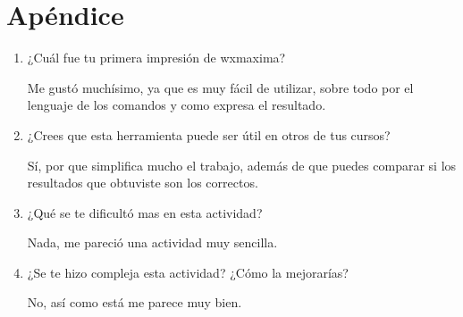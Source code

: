 \documentclass{article}
\begin{document}
\section{Apéndice}
\begin{enumerate}
\item ¿Cuál fue tu primera impresión de wxmaxima?

Me gustó muchísimo, ya que es muy fácil de utilizar, sobre todo por el lenguaje de los comandos y como expresa el resultado.
\item ¿Crees que esta herramienta puede ser útil en otros de tus cursos?

Sí, por que simplifica mucho el trabajo, además de que puedes comparar si los resultados que obtuviste son los correctos.
\item ¿Qué se te dificultó mas en esta actividad?

Nada, me pareció una actividad muy sencilla.
\item ¿Se te hizo compleja esta actividad? ¿Cómo la mejorarías? 

No, así como está me parece muy bien.
\end{enumerate}
\end{document}
